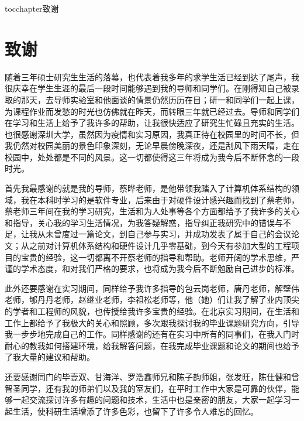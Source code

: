 
\newenvironment{theacknowledgements}{\wuhao\song}

\addcontentsline{toc}{chapter}{致谢}%
\chapter*{\centering\xiaosan\hei\bfseries 致\quad 谢}

\begin{theacknowledgements}
	
随着三年硕士研究生生活的落幕，也代表着我多年的求学生活已经到达了尾声，我很庆幸在学生生涯的最后一段时间能够遇到我的导师和同学们。在刚得知自己被录取的那天，去导师实验室和他面谈的情景仍然历历在目；研一和同学们一起上课，为课程作业而发愁的时光也仿佛就在昨天，而转眼三年就已经过去。导师和同学们在学习和生活上给予了我许多的帮助，让我很快适应了研究生忙碌且充实的生活。也很感谢深圳大学，虽然因为疫情和实习原因，我真正待在校园里的时间不长，但我仍然对校园美丽的景色印象深刻，无论早晨傍晚深夜，还是刮风下雨天晴，走在校园中，处处都是不同的风景。这一切都使得这三年将成为我今后不断怀念的一段时光。

首先我最感谢的就是我的导师，蔡晔老师，是他带领我踏入了计算机体系结构的领域，我在本科时学习的是软件专业，后来由于对硬件设计感兴趣而找到了蔡老师，蔡老师三年间在我的学习研究，生活和为人处事等各个方面都给予了我许多的关心和指导，关心我的学习生活情况，为我答疑解惑，指导纠正我研究中的错误与不足，让我从未曾度过一篇论文，到自己参与实习，并成功发表了属于自己的会议论文；从之前对计算机体系结构和硬件设计几乎零基础，到今天有参加大型的工程项目的宝贵的经验，这一切都离不开蔡老师的指导和帮助。老师开阔的学术思维，严谨的学术态度，和对我们严格的要求，也将成为我今后不断勉励自己进步的标准。

此外还要感谢在实习期间，同样给予我许多指导的包云岗老师，唐丹老师，解壁伟老师，郇丹丹老师，赵继业老师，李祖松老师等，他（她）们让我了解了业内顶尖的学者和工程师的风貌，也传授给我许多宝贵的经验。在北京实习期间，在生活和工作上都给予了我极大的关心和照顾，多次跟我探讨我的毕业课题研究方向，引导我一步步地完成自己的工作。同样感谢的还有在实习中所有的同事们，在我入门时耐心的教我如何搭建环境，给我解答问题，在我完成毕业课题和论文的期间也给予了我大量的建议和帮助。

还要感谢同门的毕壹双、甘海洋、罗浩鑫师兄和陈子韵师姐，张发旺，陈仕健和曾智圣同学，还有我的师弟们以及我的室友们，在平时工作中大家是可靠的伙伴，能够一起交流探讨许多有趣的问题和技术，生活中也是亲密的朋友，大家一起学习一起生活，使科研生活增添了许多色彩，也留下了许多令人难忘的回忆。


\end{theacknowledgements}
